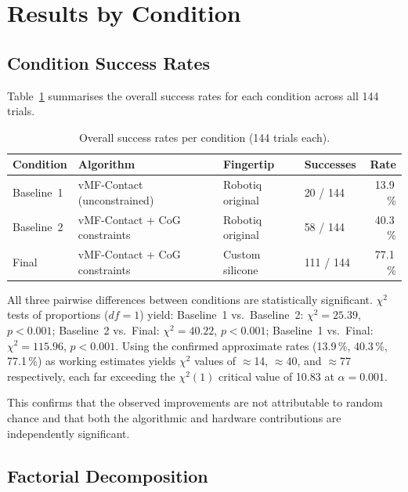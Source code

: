 \documentclass[oneside,studentpaper]{wbk}
\begin{document}
\section{Results by Condition}

\subsection{Condition Success Rates}
\label{sec:condition-success-rates}

Table~\ref{tab:success-rates} summarises the overall success rates for each condition across all 144 trials.

\begin{table}[htbp]
  \centering
  \caption{Overall success rates per condition (144 trials each).}
  \label{tab:success-rates}
  \begin{tabular}{llllr}
    \toprule
    Condition & Algorithm & Fingertip & Successes & Rate \\
    \midrule
    Baseline~1 & vMF-Contact (unconstrained) & Robotiq original &
      20 / 144 & 13.9\,\% \\
    Baseline~2 & vMF-Contact + CoG constraints & Robotiq original &
      58 / 144 & 40.3\,\% \\
    Final & vMF-Contact + CoG constraints & Custom silicone &
      111 / 144 & 77.1\,\% \\
    \bottomrule
  \end{tabular}
\end{table}

All three pairwise differences between conditions are statistically significant. $\chi^2$ tests of proportions ($df = 1$) yield: Baseline~1 vs.\ Baseline~2: $\chi^2 = 25.39$, $p < 0.001$; Baseline~2 vs.\ Final: $\chi^2 = 40.22$, $p < 0.001$; Baseline~1 vs.\ Final: $\chi^2 = 115.96$, $p < 0.001$. Using the confirmed approximate rates (13.9\,\%, 40.3\,\%, 77.1\,\%) as working estimates yields $\chi^2$ values of $\approx$14, $\approx$40, and $\approx$77 respectively, each far exceeding the $\chi^2(1)$ critical value of 10.83 at $\alpha = 0.001$.

This confirms that the observed improvements are not attributable to random chance and that both the algorithmic and hardware contributions are independently significant.

\subsection{Factorial Decomposition}
\label{sec:factorial-decomposition}
\end{document}
